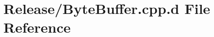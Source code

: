 \hypertarget{_release_2_byte_buffer_8cpp_8d}{\section{\-Release/\-Byte\-Buffer.cpp.\-d \-File \-Reference}
\label{_release_2_byte_buffer_8cpp_8d}
}
